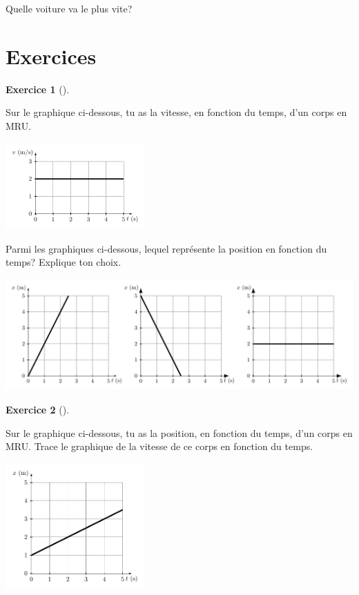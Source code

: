 \documentclass[
  letterpaper,
  DIV=11,
  numbers=noendperiod]{scrartcl}
\theoremstyle{definition}
\newtheorem{exercise}{Exercice}[section]
\theoremstyle{definition}
\theoremstyle{remark}
\begin{document}
Quelle voiture va le plus vite?

\vspace{3cm}
\newpage

\section{Exercices}\label{exercices}

\begin{exercise}[]\protect\hypertarget{exr-xapdv}{}\label{exr-xapdv}

Sur le graphique ci-dessous, tu as la vitesse, en fonction du temps,
d'un corps en MRU.

\begin{center}
\includegraphics[width=0.4\textwidth,height=\textheight]{figures/mru/fig6.pdf}
\end{center}

Parmi les graphiques ci-dessous, lequel représente la position en
fonction du temps? Explique ton choix. \begin{center}
\includegraphics[width=1\textwidth,height=\textheight]{figures/mru/fig7.pdf}
\end{center}

\end{exercise}

\newpage

\begin{exercise}[]\protect\hypertarget{exr-vapdx}{}\label{exr-vapdx}

Sur le graphique ci-dessous, tu as la position, en fonction du temps,
d'un corps en MRU. Trace le graphique de la vitesse de ce corps en
fonction du temps.

\begin{center}
\includegraphics[width=0.4\textwidth,height=\textheight]{figures/mru/fig8.pdf}
\end{center}

\end{exercise}
\end{document}

